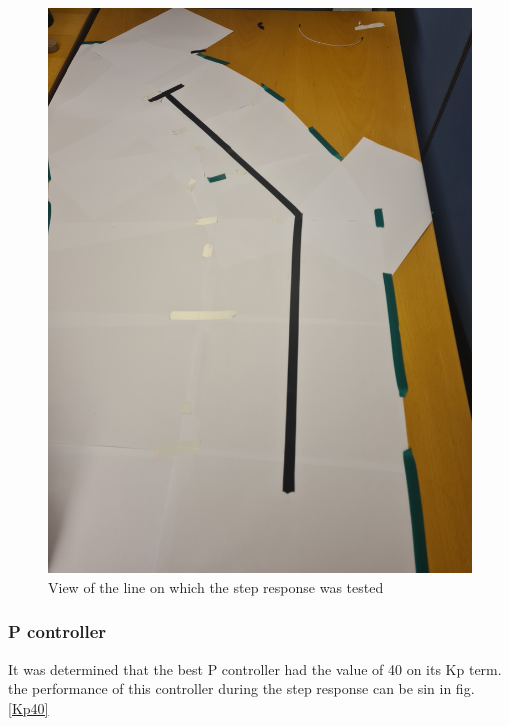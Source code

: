 \begin{figure}[H]
    \centering
    \includegraphics[width=\textwidth]{assets/Step Response.jpg}
    \caption{View of the line on which the step response was tested}
    \label{Step Response}
\end{figure}

\subsubsection{P controller}
It was determined that the best P controller had the value of 40 on its Kp term. the performance of this controller during the step response can be sin in fig. \ref{Kp40}

